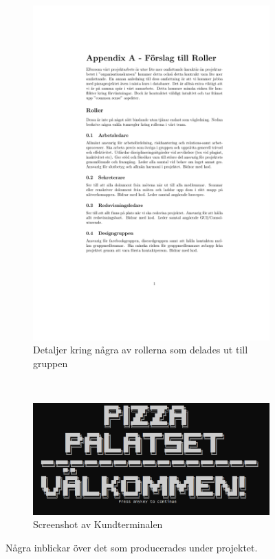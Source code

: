 \documentclass{article}
\theoremstyle{remark}                                         %
\begin{document}
\begin{figure}
    \vspace{-2cm}
    \begin{subfigure}[b]{\textwidth}
        \includegraphics[width=\textwidth]{img/Appendix_A___Roller.pdf}
        \vspace{-5cm}
        \caption{Detaljer kring några av rollerna som delades ut till gruppen}
        \label{fig:roller}
    \end{subfigure}
     \vspace{1cm}

    ~
    \begin{subfigure}[b]{\textwidth}
        \includegraphics[width=\textwidth]{img/Skissbilder/KundTerminalLogo.PNG}
        \caption{Screenshot av Kundterminalen}
        \label{fig:kundterminal}
    \end{subfigure}
    \caption{Några inblickar över det som producerades under projektet.}
    \vspace{5cm}


\end{figure}
\end{document}
